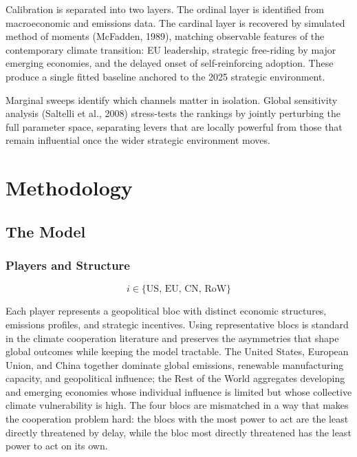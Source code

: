 \documentclass[10pt,a4paper]{article}
\begin{document}
Calibration is separated into two layers. The ordinal layer is identified from macroeconomic and emissions data. The cardinal layer is recovered by simulated method of moments (McFadden, 1989), matching observable features of the contemporary climate transition: EU leadership, strategic free-riding by major emerging economies, and the delayed onset of self-reinforcing adoption. These produce a single fitted baseline anchored to the 2025 strategic environment.

Marginal sweeps identify which channels matter in isolation. Global sensitivity analysis (Saltelli et al., 2008) stress-tests the rankings by jointly perturbing the full parameter space, separating levers that are locally powerful from those that remain influential once the wider strategic environment moves.

\clearpage
\needspace{12em}
\section{Methodology}

\needspace{12em}
\subsection{The Model}

\needspace{12em}
\subsubsection*{Players and Structure}

\[
i \in \{\text{US, EU, CN, RoW}\}
\]

Each player represents a geopolitical bloc with distinct economic structures, emissions profiles, and strategic incentives. Using representative blocs is standard in the climate cooperation literature and preserves the asymmetries that shape global outcomes while keeping the model tractable. The United States, European Union, and China together dominate global emissions, renewable manufacturing capacity, and geopolitical influence; the Rest of the World aggregates developing and emerging economies whose individual influence is limited but whose collective climate vulnerability is high. The four blocs are mismatched in a way that makes the cooperation problem hard: the blocs with the most power to act are the least directly threatened by delay, while the bloc most directly threatened has the least power to act on its own.
\end{document}
